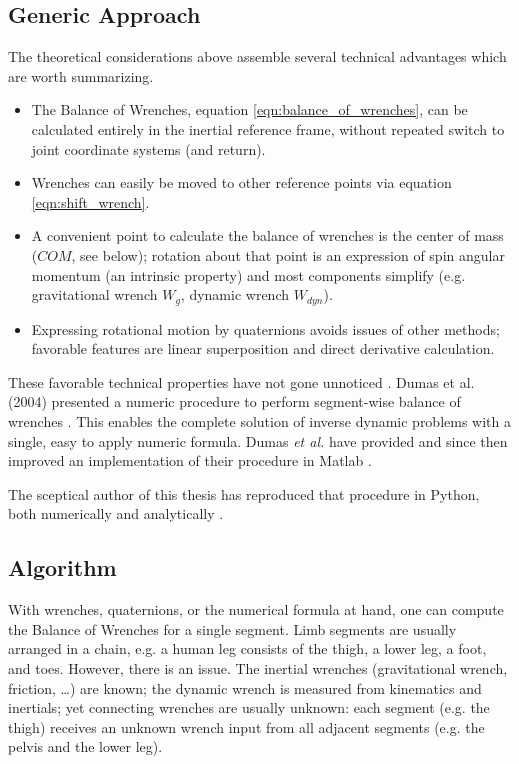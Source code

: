 \documentclass[10pt,a4paper]{article}
\begin{document}
\subsection{Generic Approach}
\label{sec:org22dd64c}
The theoretical considerations above assemble several technical advantages which are worth summarizing.
\begin{itemize}
\item The Balance of Wrenches, equation \eqref{eqn:balance_of_wrenches}, can be calculated entirely in the inertial reference frame, without repeated switch to joint coordinate systems (and return).
\item Wrenches can easily be moved to other reference points via equation \eqref{eqn:shift_wrench}.
\item A convenient point to calculate the balance of wrenches is the center of mass (\(COM\), see below); rotation about that point is an expression of spin angular momentum (an intrinsic property) and most components simplify (e.g. gravitational wrench \(W_{g}\), dynamic wrench \(W_{dyn}\)).
\item Expressing rotational motion by quaternions avoids issues of other methods; favorable features are linear superposition and direct derivative calculation.
\end{itemize}

These favorable technical properties have not gone unnoticed \citep{Dumas2004,Dumas2007}.
Dumas et al. (2004) presented a numeric procedure to perform segment-wise balance of wrenches \citep[equation 15 in][]{Dumas2004}.
This enables the complete solution of inverse dynamic problems with a single, easy to apply numeric formula.
Dumas \emph{et al.} have provided and since then improved an implementation of their procedure in Matlab \citep{DumasMatlab}.


The sceptical author of this thesis has reproduced that procedure in Python, both numerically and analytically \citep{Mielke2021id}.


\subsection{Algorithm}
\label{sec:org1bc797b}
With wrenches, quaternions, or the numerical formula at hand, one can compute the Balance of Wrenches for a single segment.
Limb segments are usually arranged in a chain, e.g. a human leg consists of the thigh, a lower leg, a foot, and toes.
However, there is an issue.
The inertial wrenches (gravitational wrench, friction, \ldots{}) are known; the dynamic wrench is measured from kinematics and inertials; yet connecting wrenches are usually unknown: each segment (e.g. the thigh) receives an unknown wrench input from all adjacent segments (e.g. the pelvis and the lower leg).
\end{document}
